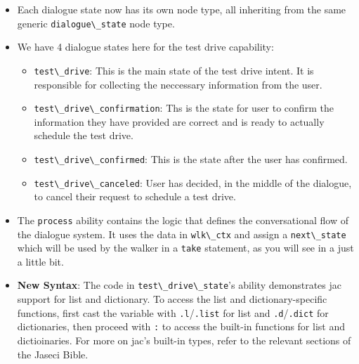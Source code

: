 \begin{itemize}
\tightlist
\item
  Each dialogue state now has its own node type, all inheriting from the
  same generic \passthrough{\lstinline!dialogue\_state!} node type.
\item
  We have 4 dialogue states here for the test drive capability:

  \begin{itemize}
  \tightlist
  \item
    \passthrough{\lstinline!test\_drive!}: This is the main state of the
    test drive intent. It is responsible for collecting the neccessary
    information from the user.
  \item
    \passthrough{\lstinline!test\_drive\_confirmation!}: Ths is the
    state for user to confirm the information they have provided are
    correct and is ready to actually schedule the test drive.
  \item
    \passthrough{\lstinline!test\_drive\_confirmed!}: This is the state
    after the user has confirmed.
  \item
    \passthrough{\lstinline!test\_drive\_canceled!}: User has decided,
    in the middle of the dialogue, to cancel their request to schedule a
    test drive.
  \end{itemize}
\item
  The \passthrough{\lstinline!process!} ability contains the logic that
  defines the conversational flow of the dialogue system. It uses the
  data in \passthrough{\lstinline!wlk\_ctx!} and assign a
  \passthrough{\lstinline!next\_state!} which will be used by the walker
  in a \passthrough{\lstinline!take!} statement, as you will see in a
  just a little bit.
\item
  \textbf{New Syntax}: The code in
  \passthrough{\lstinline!test\_drive\_state!}'s ability demonstrates
  jac support for list and dictionary. To access the list and
  dictionary-specific functions, first cast the variable with
  \passthrough{\lstinline!.l!}/\passthrough{\lstinline!.list!} for list
  and \passthrough{\lstinline!.d!}/\passthrough{\lstinline!.dict!} for
  dictionaries, then proceed with \passthrough{\lstinline!:!} to access
  the built-in functions for list and dictioinaries. For more on jac's
  built-in types, refer to the relevant sections of the Jaseci Bible.


\end{itemize}
